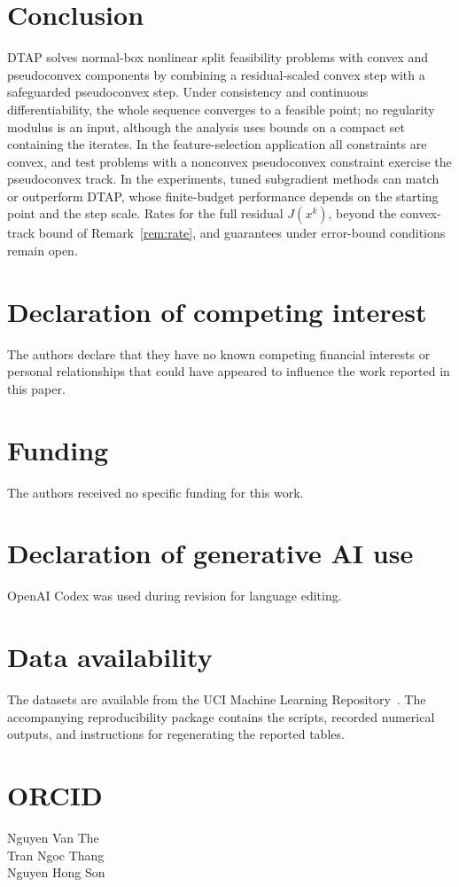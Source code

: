 \documentclass[]{interact}
\theoremstyle{plain}
\theoremstyle{definition}
\theoremstyle{remark}
\begin{document}
\section{Conclusion}\label{sec:conclusion}
DTAP solves normal-box nonlinear split feasibility problems with convex and pseudoconvex components by combining a residual-scaled convex step with a safeguarded pseudoconvex step. Under consistency and continuous differentiability, the whole sequence converges to a feasible point; no regularity modulus is an input, although the analysis uses bounds on a compact set containing the iterates. In the feature-selection application all constraints are convex, and test problems with a nonconvex pseudoconvex constraint exercise the pseudoconvex track. In the experiments, tuned subgradient methods can match or outperform DTAP, whose finite-budget performance depends on the starting point and the step scale. Rates for the full residual $J(x^k)$, beyond the convex-track bound of Remark~\ref{rem:rate}, and guarantees under error-bound conditions remain open.

\section*{Declaration of competing interest}
The authors declare that they have no known competing financial interests or personal relationships that could have appeared to influence the work reported in this paper.
\section*{Funding}
The authors received no specific funding for this work.
\section*{Declaration of generative AI use}
OpenAI Codex was used during revision for language editing.
\section*{Data availability}
The datasets are available from the UCI Machine Learning Repository~\citep{kelly2023uci}. The accompanying reproducibility package contains the scripts, recorded numerical outputs, and instructions for regenerating the reported tables.

\section*{ORCID}
\noindent Nguyen Van The~\\
Tran Ngoc Thang~\\
Nguyen Hong Son~
\end{document}
